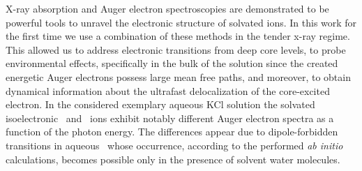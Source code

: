 X-ray absorption and Auger electron spectroscopies are demonstrated to be powerful tools to unravel the electronic structure of solvated ions. In this work for the first time we use a combination of these methods in the tender x-ray regime. This allowed us to address electronic transitions from deep core levels, to probe environmental effects, specifically in the bulk of the solution since the created energetic Auger electrons possess large mean free paths, {\color{red}and moreover, to obtain dynamical information about the ultrafast delocalization of the core-excited electron}. In the considered exemplary aqueous KCl solution the solvated isoelectronic \ki~and \cli~ions exhibit notably different Auger electron spectra as a function of the photon energy. The differences appear due to dipole-forbidden transitions in aqueous \ki~whose occurrence, according to the performed {\it ab initio} calculations, becomes possible only in the presence of solvent water molecules.

